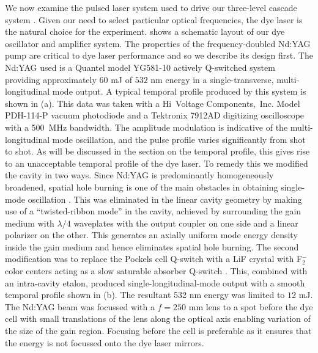 \hspace{\parindent}  We now examine the pulsed laser system
used to drive our three-level cascade system \cite{Corless:97}.  Given our need
to select particular optical frequencies, the dye laser is the
natural choice for the experiment.   shows a schematic layout of
our dye oscillator and amplifier system. The properties of the frequency-doubled
Nd:YAG pump are critical to dye laser performance and so we describe its
design first.  The Nd:YAG used is a Quantel model YG581-10 actively
Q-switched system providing approximately $ 60 $ mJ of $ 532 $ nm energy in a
single-transverse, multi-longitudinal mode output.  A typical temporal
profile produced by this system is shown in (a).  This data was
taken with a Hi~Voltage Components,~Inc. Model PDH-114-P vacuum photodiode and
a Tektronix 7912AD digitizing oscilloscope with a 500~MHz bandwidth.  The
amplitude modulation is indicative of the multi-longitudinal mode oscillation,
and the pulse profile varies significantly from shot to shot. As will be
discussed in the section on the temporal profile, this gives rise to an
unacceptable temporal profile of the dye laser.  To remedy this we modified the
cavity in two ways.  Since Nd:YAG is predominantly homogeneously broadened,
spatial hole burning is one of the main obstacles in obtaining single-mode
oscillation \cite{Draegert:72}. This was eliminated in the linear cavity
geometry by making use of a ``twisted-ribbon mode'' \cite{Evtuhov:65} in the
cavity, achieved by surrounding the gain medium with $ \lambda/4 $
waveplates with the output coupler on one side and a linear polarizer on the
other.  This generates an axially uniform mode energy density inside the gain
medium and hence eliminates spatial hole burning.  The second modification was
to replace the Pockels cell Q-switch with a LiF crystal with F$_2^{-}$ color
centers acting as a slow saturable absorber Q-switch \cite{Sumida:86}.  This,
combined with an intra-cavity etalon, produced single-longitudinal-mode output
with a smooth temporal profile shown in
(b).  The resultant 532 nm energy was limited to $12$ mJ. The
Nd:YAG beam was focussed with a $f=250$ mm lens to a spot before the dye cell
with small translations of the lens along the optical axis enabling variation
of the size of the gain region.  Focusing before the cell is preferable as it
ensures that the energy is not focussed onto the dye laser mirrors.

\begin{figure}[tb]
\bigskip
{}
\end{figure}

